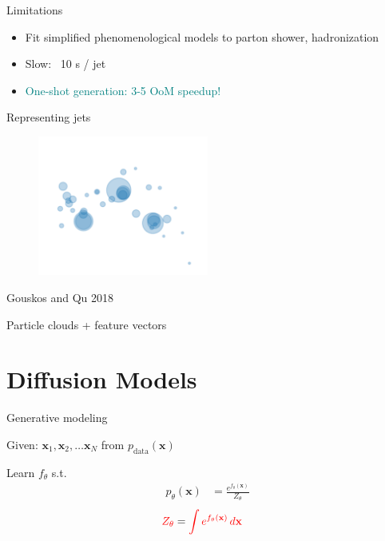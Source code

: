 \documentclass[handout, aspectratio=169,xcolor=dvipsnames]{beamer}
\newcommand{\bx}{\mathbf{x}}
\begin{document}
\begin{frame}{Limitations}
  \begin{itemize}
    \pause
    \item Fit simplified phenomenological models to parton shower, hadronization
    \pause
    \item Slow: ~10 s / jet
    \pause
    \item \textcolor{teal}{One-shot generation: 3-5 OoM speedup!}
  \end{itemize}
\end{frame}


\begin{frame}{Representing jets}

  \pause

  \begin{figure}
    \centering
    \includegraphics[width=0.5\textwidth]{figs/point-cloud-Gouskos-2018.png}
  \end{figure}
  \begin{center}
    \tiny{Gouskos and Qu 2018}
  \end{center}

  \pause
  \centering
  Particle clouds + feature vectors
  
\end{frame}

\section{Diffusion Models}
\begin{frame}{Generative modeling}

\pause

Given: $\bx_1, \bx_2, \dots \bx_N$ from $p_\text{data}(\bx)$
\vspace{0.25cm}
\pause

Learn $f_\theta$ s.t.
\begin{eqnarray*}
    p_{\theta}(\bx) &= \frac{e^{f_\theta(\bx)}}{Z_\theta}
\end{eqnarray*}
\pause
\begin{align*}
    \textcolor{red}{Z_\theta} &= \textcolor{red}{\int e^{f_\theta(\bx)} \,d\bx}
\end{align*}

\end{frame}
\end{document}
